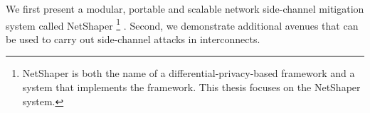 We first present a modular, portable and scalable network side-channel mitigation system called NetShaper 
\footnote{NetShaper is both the name of a differential-privacy-based framework and a system that implements the framework. This thesis focuses on the NetShaper system.} \cite{sabzi2024netshaper}.
Second, we demonstrate additional avenues that can be used to carry out side-channel attacks in interconnects.


\begin{comment}


End-host modification (not scalable):
\cite{cai2014csbuflo, cherubin2017llama, luo2011httpos, smith2022qcsd, wang2017walkie}

Relies on only simulation or do not have any deployable implementation:
\cite{abusnaina2020dfd, beckerle2022splitting, cai2014tamaraw, gong2022surakav, hou2020wf, juarez2016wtfpad, nasr2021blind, rahman2020mockingbird, shan2021dolos, wang2014supersequence, wright2009morphing}

Not-adaptive to application requirements:
\cite{barradas2017deltashaper}

Not application agnostic:
\cite{cherubin2017llama, luo2011httpos}

Hard to deploy:
\cite{beckerle2022splitting, de2020trafficsliver}

\end{comment}